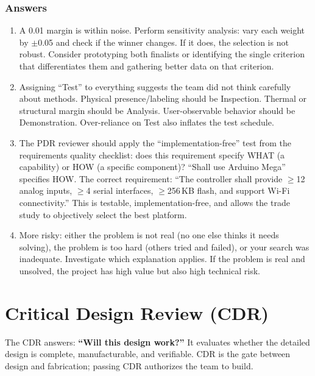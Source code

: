 \documentclass[11pt,letterpaper,twoside,openany]{book}
\begin{document}
\subsection{Answers}
\begin{enumerate}[leftmargin=1.5em]
\item A 0.01 margin is within noise. Perform sensitivity analysis: vary each weight by $\pm$0.05 and check if the winner changes. If it does, the selection is not robust. Consider prototyping both finalists or identifying the single criterion that differentiates them and gathering better data on that criterion.
\item Assigning ``Test'' to everything suggests the team did not think carefully about methods. Physical presence/labeling should be Inspection. Thermal or structural margin should be Analysis. User-observable behavior should be Demonstration. Over-reliance on Test also inflates the test schedule.

\item The PDR reviewer should apply the ``implementation-free'' test from the requirements quality checklist: does this requirement specify WHAT (a capability) or HOW (a specific component)? ``Shall use Arduino Mega'' specifies HOW. The correct requirement: ``The controller shall provide $\geq$12 analog inputs, $\geq$4 serial interfaces, $\geq$256\,KB flash, and support Wi-Fi connectivity.'' This is testable, implementation-free, and allows the trade study to objectively select the best platform.
\item More risky: either the problem is not real (no one else thinks it needs solving), the problem is too hard (others tried and failed), or your search was inadequate. Investigate which explanation applies. If the problem is real and unsolved, the project has high value but also high technical risk.
\end{enumerate}


\chapter{Critical Design Review (CDR)}

\vspace{1em}

The CDR answers: \textbf{``Will this design work?''} It evaluates whether the detailed design is complete, manufacturable, and verifiable. CDR is the gate between design and fabrication; passing CDR authorizes the team to build.

\vspace{1em}
\end{document}
